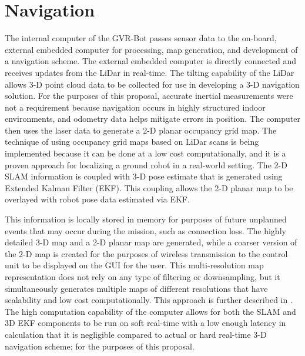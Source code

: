 \section{Navigation}\label{sec:navigation}

The internal computer of the GVR-Bot passes sensor data to the on-board, external embedded computer for processing, map generation, and development of a navigation scheme. The external embedded computer is directly connected and receives updates from the LiDar in real-time. The tilting capability of the LiDar allows 3-D point cloud data to be collected for use in developing a 3-D navigation solution. For the purposes of this proposal, accurate inertial measurements were not a requirement because navigation occurs in highly structured indoor environments, and odometry data helps mitigate errors in position. The computer then uses the laser data to generate a 2-D planar occupancy grid map. The technique of using occupancy grid maps based on LiDar scans is being implemented because it can be done at a low cost computationally, and it is a proven approach for localizing a ground robot in a real-world setting\cite{thrun2005probabilistic}\cite{kohlbrecher2011flexible}. The 2-D SLAM information is coupled with 3-D pose estimate that is generated using Extended Kalman Filter (EKF). This coupling allows the 2-D planar map to be overlayed with robot pose data estimated via EKF. 

This information is locally stored in memory for purposes of future unplanned events that may occur during the mission, such as connection loss. The highly detailed 3-D map and a 2-D planar map are generated, while a coarser version of the 2-D map is created for the purposes of wireless transmission to the control unit to be displayed on the GUI for the user. This multi-resolution map representation does not rely on any type of filtering or downsampling, but it simultaneously generates multiple maps of different resolutions that have scalability  and low cost computationally. This approach is further described in \cite{kohlbrecher2011flexible}\cite{habbecke2006iterative}. The high computation capability of the computer allows for both the SLAM and 3D EKF components to be run on soft real-time with a low enough latency in calculation that it is negligible compared to actual or hard real-time 3-D navigation scheme; for the purposes of this proposal.